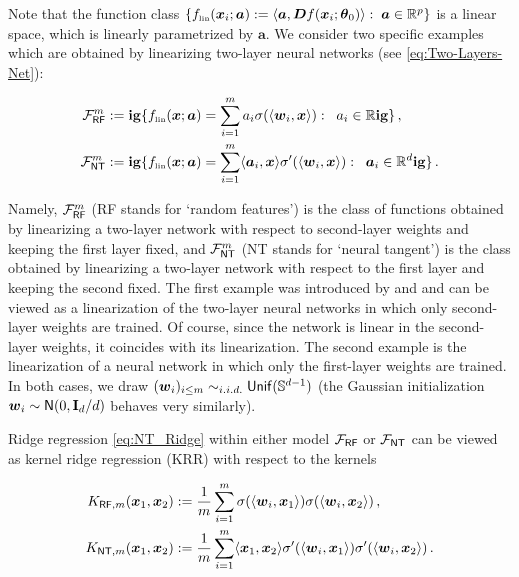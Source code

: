 Note that the function class $\{ f_{\mbox{\rm\tiny lin}}({\boldsymbol x}_i;{\boldsymbol a}):= \langle{\boldsymbol a},{\boldsymbol D} f({\boldsymbol x}_i;{\boldsymbol \theta}_0)\rangle:\; {\boldsymbol a}\in{\mathbb R}^p\}$ is a linear space, which is linearly parametrized by ${\boldsymbol a}$. We consider two specific examples which are obtained by linearizing two-layer neural networks (see \eqref{eq:Two-Layers-Net}):

\begin{align}
  {\mathcal F}^m_{{\sf RF}}&:=\mathbf{ig}\{f_{\mbox{\rm\tiny lin}}({\boldsymbol x};{\boldsymbol a}) = \sum_{i=1}^m a_i\sigma(\langle{\boldsymbol w}_i,{\boldsymbol x}\rangle):\;\; a_i\in {\mathbb R}\mathbf{ig}\}\, ,\label{eq:F_RF}\\
  {\mathcal F}^m_{{\sf NT}}&:=\mathbf{ig}\{f_{\mbox{\rm\tiny lin}}({\boldsymbol x};{\boldsymbol a}) = \sum_{i=1}^m \langle{\boldsymbol a}_i,{\boldsymbol x}\rangle\sigma'(\langle{\boldsymbol w}_i,{\boldsymbol x}\rangle):\;\; {\boldsymbol a}_i\in {\mathbb R}^d\mathbf{ig}\}\, .\label{eq:F_NT}
\end{align}

 Namely,  ${\mathcal F}^m_{{\sf RF}}$ (RF stands for `random features') is the class of functions obtained by linearizing a two-layer network with respect to second-layer weights and keeping the first layer fixed, and ${\mathcal F}^m_{{\sf NT}}$ (NT stands for `neural tangent') is the class obtained by linearizing a two-layer network with respect to the first layer and keeping the second fixed. The first example was introduced by \cite{balcan2006kernels} and \cite{rahimi2007random} and can be viewed as a linearization of the two-layer neural networks in which only second-layer weights are trained. Of course, since the network is linear in the second-layer weights, it coincides with its linearization. The second example is the linearization of a neural network in which only the first-layer weights are trained. In both cases, we draw $({\boldsymbol w}_i)_{i\le m}\sim_{i.i.d.}{\sf Unif}(\mathbb{S}^{d-1})$ (the Gaussian initialization ${\boldsymbol w}_i\sim{\sf N}(0,{\mathbf I}_d/d)$ behaves very similarly).

Ridge regression \eqref{eq:NT_Ridge} within either model ${\mathcal F}_{{\sf RF}}$ or  ${\mathcal F}_{{\sf NT}}$ can be viewed as kernel ridge regression (KRR) with respect to the kernels

\begin{align}
  K_{{\sf RF},m}({\boldsymbol x}_1,{\boldsymbol x}_2) &:=\frac{1}{m}\sum_{i=1}^m\sigma(\langle{\boldsymbol w}_i,{\boldsymbol x}_1\rangle)\sigma(\langle{\boldsymbol w}_i,{\boldsymbol x}_2\rangle)\, ,\\
  K_{{\sf NT},m}({\boldsymbol x}_1,{\boldsymbol x}_2) &:=\frac{1}{m}\sum_{i=1}^m\langle{\boldsymbol x}_1,{\boldsymbol x}_2\rangle\sigma'(\langle{\boldsymbol w}_i,{\boldsymbol x}_1\rangle)\sigma'(\langle{\boldsymbol w}_i,{\boldsymbol x}_2\rangle)\, .
\end{align}

